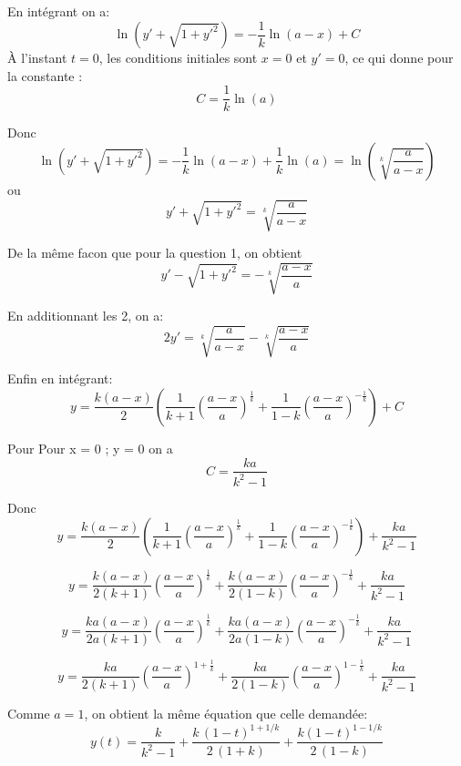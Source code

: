 \documentclass[]{book}
\theoremstyle{definition}
\begin{document}
En int\'egrant on a:
$$
\ln(y'+{\sqrt  {1+y'^{2}}})=-\frac{1}{k}\ln(a-x)+C
$$
\`A l'instant $t=0$, les conditions initiales sont $x=0$ et $y'=0$, ce qui donne pour la constante :
$$
C=\frac{1}{k}\ln(a)
$$

Donc
$$
\ln(y'+{\sqrt  {1+y'^{2}}})=-\frac{1}{k}\ln(a-x)+\frac{1}{k}\ln(a) = \ln \left(\sqrt[k]{\frac{a}{a-x}}\right)
$$
ou
$$
y'+\sqrt  {1+y'^{2}}=\sqrt[k]{\frac{a}{a-x}}
$$

De la m\^eme facon que pour la question 1, on obtient
$$
y'-\sqrt  {1+y'^{2}}=-\sqrt[k]{\frac{a-x}{a}}
$$

En additionnant les 2, on a:
$$
2y' = \sqrt[k]{\frac{a}{a-x}} - \sqrt[k]{\frac{a-x}{a}}
$$

Enfin en int\'egrant:
$$
y={\frac{k(a-x)}{2}}\left({\frac{1}{k+1}}\left({\frac{a-x}{a}}\right)^{{{\frac{1}{k}}}}+{\frac{1}{1-k}}\left({\frac{a-x}{a}}\right)^{{-{\frac  {1}{k}}}}\right)+C
$$

Pour Pour x = 0 ; y = 0 on a 
$$
C=\frac  {ka}{k^{2}-1}
$$

Donc
$$y={\frac{k(a-x)}{2}}\left({\frac{1}{k+1}}\left({\frac{a-x}{a}}\right)^{{{\frac{1}{k}}}}+{\frac{1}{1-k}}\left({\frac{a-x}{a}}\right)^{{-{\frac  {1}{k}}}}\right)+ \frac  {ka}{k^{2}-1}
$$

$$y={\frac{k(a-x)}{2(k+1)}}\left({\frac{a-x}{a}}\right)^{{{\frac{1}{k}}}}+{\frac{k(a-x)}{2(1-k)}}\left({\frac{a-x}{a}}\right)^{{-{\frac  {1}{k}}}} + \frac  {ka}{k^{2}-1}
$$

$$y={\frac{ka(a-x)}{2a(k+1)}}\left({\frac{a-x}{a}}\right)^{{{\frac{1}{k}}}}+{\frac{ka(a-x)}{2a(1-k)}}\left({\frac{a-x}{a}}\right)^{{-{\frac  {1}{k}}}} + \frac  {ka}{k^{2}-1}
$$

$$y={\frac{ka}{2(k+1)}}\left({\frac{a-x}{a}}\right)^{{{1+\frac{1}{k}}}}+{\frac{ka}{2(1-k)}}\left({\frac{a-x}{a}}\right)^{{1-{\frac  {1}{k}}}} + \frac  {ka}{k^{2}-1}
$$

Comme $a =1$, on obtient la m\^eme \'equation que celle demand\'ee:
$$
y(t) = \frac{k}{k^2-1} + \frac{k\,(1-t)^{1+1/k}}{2\,(1+k)}+\frac{k(1-t)^{1-1/k}}{2\,(1-k)}
$$
\end{document}
